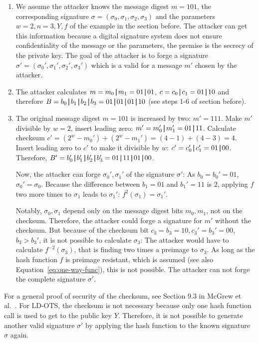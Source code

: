 \begin{enumerate}
\item We assume the attacker knows the message digest $m = 101$, the corresponding signature $\sigma = (\sigma_0, \sigma_1, \sigma_2, \sigma_3)$ and the parameters $w=2, n=3, Y, f$ of the example in the section before. The attacker can get this information because a digital signature system does not ensure confidentiality of the message or the parameters, the premise is the secrecy of the private key. The goal of the attacker is to forge a signature $\sigma' = (\sigma_0', \sigma_1', \sigma_2', \sigma_3')$ which is a valid for a message $m'$ chosen by the attacker. 

\item The attacker calculates $m  = m_0 \operatorname{|\!\!|} m_1 = 01 \operatorname{|\!\!|} 01$, $c = c_0 \operatorname{|\!\!|} c_1 = 01 \operatorname{|\!\!|} 10$ and therefore $B =  b_0 \concat b_1 \concat b_2 \concat b_3 = 01 \concat 01 \concat 01 \concat 10$ (see steps 1-6 of section before).

\item The original message digest $m = 101$ is increased by two: $m' = 111$. Make $m'$ divisible by $w = 2$, insert leading zero: $m' = m_0'\operatorname{|\!\!|} m_1' = 01 \operatorname{|\!\!|} 11$. Calculate checksum $c' = (2^w - m_0') + (2^w - m_1') = (4-1)+(4-3)=4$.
Insert leading zero to $c'$ to make it divisible by $w$: $c' = c_0' \operatorname{|\!\!|} c_1' = 01 \operatorname{|\!\!|} 00$. Therefore, $B' = b_0' \concat b_1' \concat b_2' \concat b_3' = 01 \concat 11 \concat 01 \concat 00$.

Now, the attacker can forge $\sigma_0', \sigma_1'$ of the signature $\sigma'$:
As $b_0 = b_0' = 01$, $\sigma_0' = \sigma_0$.
Because the difference between $b_1 = 01$ and $b_1' = 11$ is $2$, applying $f$ two more times to $\sigma_1$ leads to $\sigma_1'$: $f^2(\sigma_1) = \sigma_1'$.

Notably, $\sigma_0, \sigma_1$ depend only on the message digest bits $m_0, m_1$, not on the checksum. Therefore, the attacker could forge a signature for $m'$ without the checksum. But because of the checksum bit $c_3 = b_3 = 10, c_3' = b_3' = 00$, $b_3 > b_3'$, it is not possible to calculate $\sigma_3$: The attacker would have to calculate $f^{-2}(\sigma_3)$, that is finding two times a preimage to $\sigma_3$. As long as the hash function $f$ is preimage resistant, which is assumed (see also Equation~\ref{eq:one-way-func}), this is not possible. The attacker can not forge the complete signature $\sigma'$.

\end{enumerate}
For a general proof of security of the checksum, see Section 9.3 in McGrew et al.~\cite{LMS_RFC8554}.
For LD-OTS, the checksum is not necessary because only one hash function call is used to get to the public key $Y$. Therefore, it is not possible to generate another valid signature $\sigma'$ by applying the hash function to the known signature $\sigma$ again.

